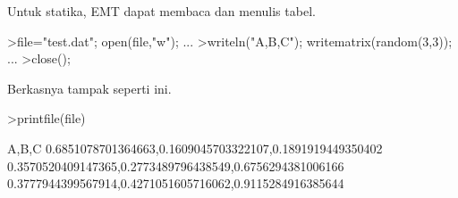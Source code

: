 \documentclass[a4paper,10pt]{article}
\begin{document}
\begin{eulernotebook}
\begin{eulercomment}
Untuk statika, EMT dapat membaca dan menulis tabel.
\end{eulercomment}
\begin{eulerprompt}
>file="test.dat"; open(file,"w"); ...
>writeln("A,B,C"); writematrix(random(3,3)); ...
>close();
\end{eulerprompt}
\begin{eulercomment}
Berkasnya tampak seperti ini.
\end{eulercomment}
\begin{eulerprompt}
>printfile(file)
\end{eulerprompt}
\begin{euleroutput}
  A,B,C
  0.6851078701364663,0.1609045703322107,0.1891919449350402
  0.3570520409147365,0.2773489796438549,0.6756294381006166
  0.3777944399567914,0.4271051605716062,0.9115284916385644
  

\end{euleroutput}
\end{eulernotebook}
\end{document}
